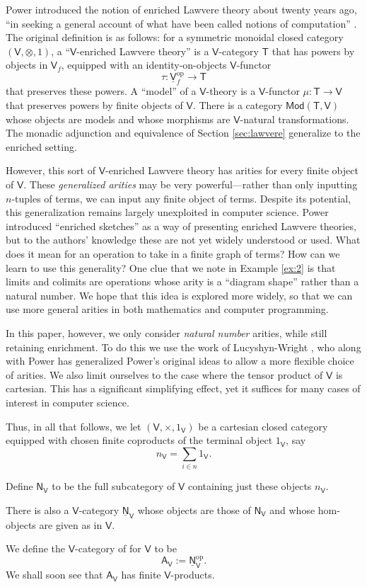 \documentclass{amsart}
\newcommand{\define}[1]{{\bf \boldmath{#1}}}
\theoremstyle{definition}
\newcommand{\Mod}{\mathsf{Mod}}
\newcommand{\NN}{\mathsf{N}}
\newcommand{\A}{\mathsf{A}}
\newcommand{\V}{\mathsf{V}}
\newcommand{\T}{\mathsf{T}}
\newcommand{\op}{\mathrm{op}}
\newcommand{\maps}{\colon}
\begin{document}
Power introduced the notion of enriched Lawvere theory about twenty years ago, ``in seeking a general account of what have been called notions of computation'' \cite{power}. The original definition is as follows: for a symmetric monoidal closed category $(\V,\otimes,1)$, a ``$\V$-enriched Lawvere theory'' is a $\V$-category $\T$ that has powers by objects in $\V_f$, equipped with an identity-on-objects $\V$-functor 
\[  \tau\maps \underline{\V}_f^\op \to \T \]
that preserves these powers.  A ``model'' of a $\V$-theory is a $\V$-functor $\mu\maps\T \to \V$ that preserves powers by finite objects of $\V$.  There is a category $\Mod(\T,\V)$ whose objects are models and whose morphisms are $\V$-natural transformations. The monadic adjunction and equivalence of Section \ref{sec:lawvere} generalize to the enriched setting.

However, this sort of $\V$-enriched Lawvere theory has arities for every finite object of $\V$.  These \textit{generalized arities} may be very powerful---rather than only inputting $n$-tuples of terms, we can input any finite object of terms.  Despite its potential, this generalization remains largely unexploited in computer science.   Power \cite{powsketch} introduced ``enriched sketches'' as a way of presenting enriched Lawvere theories, but to the authors' knowledge these are not yet widely understood or used.  What does it mean for an operation to take in a finite graph of terms?  How can we learn to use this generality? One clue that we note in Example \ref{ex:2} is that limits and colimits are operations whose arity is a ``diagram shape'' rather than a natural number. We hope that this idea is explored more widely, so that we can use more general arities in both mathematics and computer programming.

In this paper, however, we only consider \textit{natural number} arities, while still retaining enrichment. To do this we use the work of Lucyshyn-Wright \cite{lucyshyn-wright}, who along with Power \cite{np} has generalized Power's original ideas to allow a more flexible choice of arities.    We also limit ourselves to the case where the tensor product of $\V$ is cartesian.  This has a significant simplifying effect, yet it suffices for many cases of interest in computer science.

Thus, in all that follows, we let $(\V,\times,1_\V)$ be a cartesian closed category equipped with chosen finite coproducts of the terminal object $1_\V$, say 
\[   n_\V = \sum_{i \in n} 1_\V . \]  
\iffalse
These objects come with natural isomorphisms
\[
\V(n_\V,a) \cong\V(1_\V,a)^n .
\]
\fi
Define $\NN_\V$ to be the full subcategory of $\V$ containing just these objects $n_\V$.  
\iffalse
Since $\NN_\V$ has finite coproducts, $\NN_\V^\op$ has finite products.  
Let
\[ j \maps \NN_\V \hookrightarrow \V \]
be the inclusion.    
\fi
There is also a $\V$-category $\underline{\NN}_\V$ whose objects are those of $\NN_\V$ and whose hom-objects are given as in $\V$.   
\iffalse
\[         \NN_\V(a,b) = j(b)^{j(a)}  \]
for all $a,b \in \NN_\V$. 
\fi
We define the $\V$-category of \define{arities} for $\V$ to be 
\[             \A_\V := \underline{\NN}_\V^\op   .\]
We shall soon see that $\A_\V$ has finite $\V$-products. 
\end{document}
